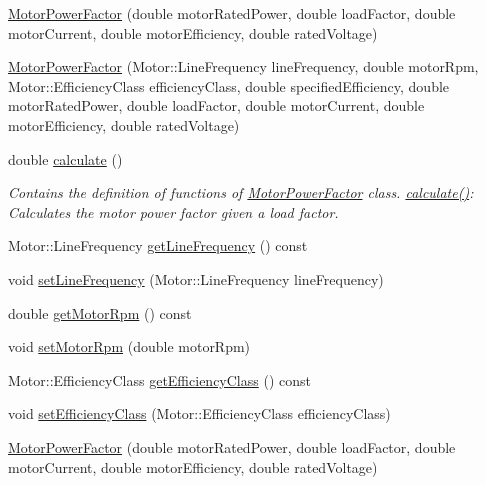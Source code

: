 \begin{DoxyCompactItemize}
\item 
\hyperlink{class_motor_power_factor_a1a2509240f0f759952debf47b7ef3a14}{Motor\+Power\+Factor} (double motor\+Rated\+Power, double load\+Factor, double motor\+Current, double motor\+Efficiency, double rated\+Voltage)
\item 
\hyperlink{class_motor_power_factor_ab48906ae429e7c6f05cebaed14fe2ca1}{Motor\+Power\+Factor} (Motor\+::\+Line\+Frequency line\+Frequency, double motor\+Rpm, Motor\+::\+Efficiency\+Class efficiency\+Class, double specified\+Efficiency, double motor\+Rated\+Power, double load\+Factor, double motor\+Current, double motor\+Efficiency, double rated\+Voltage)
\item 
double \hyperlink{class_motor_power_factor_ac9d5742db4a371bc4e15d5b29d335b6e}{calculate} ()
\begin{DoxyCompactList}\small\item\em Contains the definition of functions of \hyperlink{class_motor_power_factor}{Motor\+Power\+Factor} class. \hyperlink{class_motor_power_factor_ac9d5742db4a371bc4e15d5b29d335b6e}{calculate()}\+: Calculates the motor power factor given a load factor. \end{DoxyCompactList}\item 
Motor\+::\+Line\+Frequency \hyperlink{class_motor_power_factor_aa4cdc420b1f611bcb9f4a69c69c1fabf}{get\+Line\+Frequency} () const
\item 
void \hyperlink{class_motor_power_factor_a5186ccae4191cfc5b2b7c3bdbd166563}{set\+Line\+Frequency} (Motor\+::\+Line\+Frequency line\+Frequency)
\item 
double \hyperlink{class_motor_power_factor_acc7e144fc6c05446141cb0e07be03d70}{get\+Motor\+Rpm} () const
\item 
void \hyperlink{class_motor_power_factor_a4154bf52c6c9c9e5fb2f0985d7ae3531}{set\+Motor\+Rpm} (double motor\+Rpm)
\item 
Motor\+::\+Efficiency\+Class \hyperlink{class_motor_power_factor_a1ce98cb6ae9fbf09b05b4b6bd75e5c71}{get\+Efficiency\+Class} () const
\item 
void \hyperlink{class_motor_power_factor_add3125243d7f11131abc4e1d172ffdfc}{set\+Efficiency\+Class} (Motor\+::\+Efficiency\+Class efficiency\+Class)
\item 
\hyperlink{class_motor_power_factor_a1a2509240f0f759952debf47b7ef3a14}{Motor\+Power\+Factor} (double motor\+Rated\+Power, double load\+Factor, double motor\+Current, double motor\+Efficiency, double rated\+Voltage)

\end{DoxyCompactItemize}

